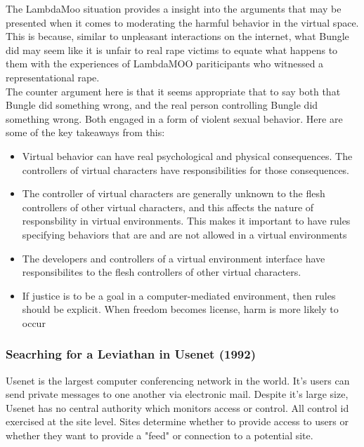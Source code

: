 \documentclass[a4paper]{article}
\begin{document}
\noindent The LambdaMoo situation provides a insight into the arguments that may be presented when it comes to
moderating the harmful behavior in the virtual space. This is because, similar to unpleasant interactions on the 
internet, what Bungle did may seem like it is unfair to real rape victims to equate what happens to them with the 
experiences of LambdaMOO pariticipants who witnessed a representational rape. \\

\noindent The counter argument here is that it seems appropriate that to say both that Bungle did something wrong,
and the real person controlling Bungle did something wrong. Both engaged in a form of violent sexual behavior. Here 
are some of the key takeaways from this:

\begin{itemize}
    \item Virtual behavior can have real psychological and physical consequences. The controllers of virtual characters
    have responsibilities for those consequences.
    \item The controller of virtual characters are generally unknown to the flesh controllers of other virtual characters,
    and this affects the nature of responsbility in virtual environments. This makes it important to have rules specifying
    behaviors that are and are not allowed in a virtual environments
    \item The developers and controllers of a virtual environment interface have responsibilites to the flesh controllers
    of other virtual characters. 
    \item If justice is to be a goal in a computer-mediated environment, then rules should be explicit. When freedom
    becomes license, harm is more likely to occur
\end{itemize}

\newpage

\subsubsection{Seacrhing for a Leviathan in Usenet (1992)}
Usenet is the largest computer conferencing network in the world. It's users can send private messages to one another 
via electronic mail. Despite it's large size, Usenet has no central authority which monitors access or control. All 
control id exercised at the site level. Sites determine whether to provide access to users or whether they want to 
provide a "feed" or connection to a potential site. \\
\end{document}
